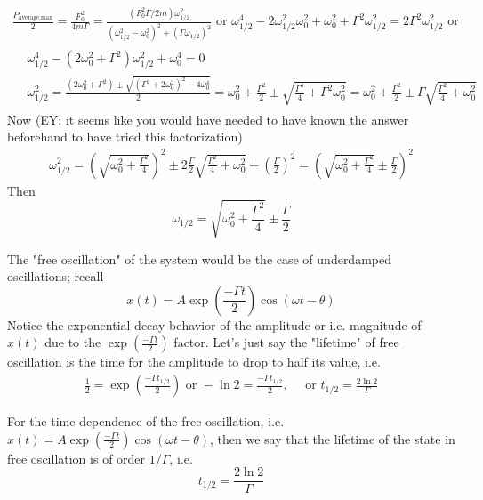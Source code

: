 \documentclass[10pt]{amsart}
\begin{document}
\begin{multicols*}{2}
\[
\begin{gathered}
	\frac{P_{\text{average,max}}}{2} = \frac{F_0^2}{4m \Gamma} = \frac{ (F_0^2 \Gamma /2m ) \omega_{1/2}^2 }{ (\omega_{1/2}^2 - \omega_0^2)^2 + (\Gamma \omega_{1/2})^2 } \text{ or } \omega_{1/2}^4 -2\omega_{1/2}^2 \omega_0^2 + \omega_0^2 + \Gamma^2 \omega_{1/2}^2 = 2\Gamma^2 \omega_{1/2}^2 \text{ or } \\
	\begin{aligned}
		& \omega_{1/2}^4 - (2\omega_0^2 + \Gamma^2) \omega_{1/2}^2 + \omega_0^4 = 0 \\
		& \omega_{1/2}^2 = \frac{ (2 \omega_0^2 + \Gamma^2) \pm \sqrt{ ( \Gamma^2 + 2\omega_0^2)^2 - 4\omega_0^4 } }{2} = \omega_0^2 + \frac{ \Gamma^2}{2} \pm \sqrt{ \frac{\Gamma^4 }{4}  + \Gamma^2 \omega_0^2 } = \omega_0^2 + \frac{ \Gamma^2}{2} \pm \Gamma \sqrt{ \frac{\Gamma^2 }{4}  +  \omega_0^2 }
	\end{aligned}
\end{gathered}
\]
Now (EY: it seems like you would have needed to have known the answer beforehand to have tried this factorization)
\[
\begin{gathered}
	\omega_{1/2}^2 = \left( \sqrt{ \omega_0^2 + \frac{\Gamma^2}{4} } \right)^2 \pm 2 \frac{\Gamma}{2} \sqrt{ \frac{\Gamma^2}{4} + \omega_0^2 } + \left( \frac{\Gamma}{2} \right)^2  = \left( \sqrt{ \omega_0^2 + \frac{ \Gamma^2}{4} } \pm \frac{\Gamma}{2} \right)^2
\end{gathered}
\]
Then
\begin{equation}
	\boxed{ \omega_{1/2} = \sqrt{ \omega_0^2 + \frac{\Gamma^2}{4} } \pm \frac{\Gamma}{2} }
\end{equation}

The "free oscillation" of the system would be the case of underdamped oscillations; recall
\[
x(t) = A \exp{ \left( \frac{-\Gamma t}{2} \right) }\cos{ (\omega t - \theta) }
\]
Notice the exponential decay behavior of the amplitude or i.e. magnitude of $x(t)$ due to the $\exp{ \left( \frac{-\Gamma t}{2} \right)}$ factor. Let's just say the "lifetime" of free oscillation is the time for the amplitude to drop to half its value, i.e.
\[
\begin{gathered}
	\frac{1}{2} = \exp{ \left( \frac{-\Gamma t_{1/2} }{2} \right) } \text{ or } -\ln{2} = \frac{-\Gamma t_{1/2} }{2} , \quad \text{ or } t_{1/2} = \frac{2\ln{2} }{\Gamma}
\end{gathered}
\]

For the time dependence of the free oscillation, i.e. $x(t) = A \exp{ \left( \frac{-\Gamma t}{2} \right) }\cos{ (\omega t - \theta) }$, then we say that the lifetime of the state in free oscillation is of order $1/\Gamma$, i.e.
\[
t_{1/2} = \frac{2\ln{2}}{ \Gamma}
\]


\end{multicols*}
\end{document}
